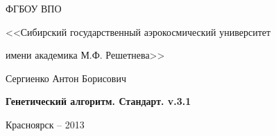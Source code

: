 \thispagestyle{empty}

\begin{center}
ФГБОУ ВПО \par
<<Сибирский государственный аэрокосмический университет \par имени академика М.Ф. Решетнева>>\par 
\par
\end{center}

\vspace{20mm}
%

\vspace{30mm}
\begin{center}
{\large Сергиенко Антон Борисович}
\end{center}

\vspace{5mm}
\begin{center}
{\bf \large Генетический алгоритм. Стандарт. v.3.1
\par}

\vspace{10mm}
%

\vspace{10mm}
%
\end{center}

\vspace{80mm}
%
%
%

\vspace{20mm}
\begin{center}
{Красноярск -- 2013}
\end{center}

\newpage